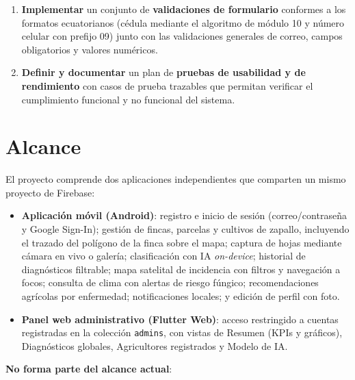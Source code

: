 \documentclass[12pt,a4paper]{article}
\begin{document}
\begin{enumerate}
  \item \textbf{Implementar} un conjunto de \textbf{validaciones de formulario}
        conformes a los formatos ecuatorianos (cédula mediante el algoritmo de
        módulo 10 y número celular con prefijo 09) junto con las validaciones
        generales de correo, campos obligatorios y valores numéricos.

  \item \textbf{Definir y documentar} un plan de \textbf{pruebas de usabilidad y
        de rendimiento} con casos de prueba trazables que permitan verificar el
        cumplimiento funcional y no funcional del sistema.
\end{enumerate}

\section{Alcance}

El proyecto comprende dos aplicaciones independientes que comparten un mismo
proyecto de Firebase:

\begin{itemize}
  \item \textbf{Aplicación móvil (Android)}: registro e inicio de sesión
        (correo/contraseña y Google Sign-In); gestión de fincas, parcelas y
        cultivos de zapallo, incluyendo el trazado del polígono de la finca sobre
        el mapa; captura de hojas mediante cámara en vivo o galería;
        clasificación con IA \textit{on-device}; historial de diagnósticos
        filtrable; mapa satelital de incidencia con filtros y navegación a focos;
        consulta de clima con alertas de riesgo fúngico; recomendaciones
        agrícolas por enfermedad; notificaciones locales; y edición de perfil con
        foto.
  \item \textbf{Panel web administrativo (Flutter Web)}: acceso restringido a
        cuentas registradas en la colección \texttt{admins}, con vistas de
        Resumen (KPIs y gráficos), Diagnósticos globales, Agricultores
        registrados y Modelo de IA.
\end{itemize}

\textbf{No forma parte del alcance actual}:
\end{document}
